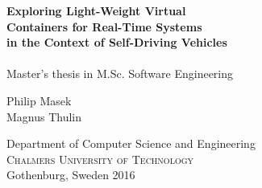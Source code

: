
\begin{titlepage}
			
\addtolength{\voffset}{2cm}




\mbox{}
\vfill
\renewcommand{\familydefault}{\sfdefault} \normalfont %
\textbf{{\Huge 	Exploring Light-Weight Virtual \\[0.2cm] Containers for Real-Time Systems\\[0.2cm] 
				in the Context of Self-Driving Vehicles \\[0.2cm] 
				}} 	\\[1cm]

Master's thesis in M.Sc. Software Engineering \setlength{\parskip}{1cm}

{\Large Philip Masek} \setlength{\parskip}{2.9cm}\newline\\
{\Large Magnus Thulin} \setlength{\parskip}{2.9cm}

Department of Computer Science and Engineering \\
\textsc{Chalmers University of Technology} \\
Gothenburg, Sweden 2016
\renewcommand{\familydefault}{\rmdefault} \normalfont %
\end{titlepage}


\newpage
\restoregeometry
\thispagestyle{empty}
\mbox{}


